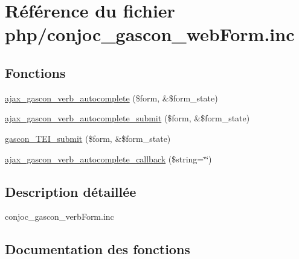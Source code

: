 \hypertarget{php_2conjoc__gascon__web_form_8inc}{}\section{Référence du fichier php/conjoc\+\_\+gascon\+\_\+web\+Form.inc}
\label{php_2conjoc__gascon__web_form_8inc}
\subsection*{Fonctions}
\begin{DoxyCompactItemize}
\item 
\hyperlink{php_2conjoc__gascon__web_form_8inc_a28516e435edf21d85ed77091d71f5d6b}{ajax\+\_\+gascon\+\_\+verb\+\_\+autocomplete} (\$form, \&\$form\+\_\+state)
\item 
\hyperlink{php_2conjoc__gascon__web_form_8inc_a332dbb7ab0a2190165164326af8cc7f1}{ajax\+\_\+gascon\+\_\+verb\+\_\+autocomplete\+\_\+submit} (\$form, \&\$form\+\_\+state)
\item 
\hyperlink{php_2conjoc__gascon__web_form_8inc_aeae9bd30b3fa7e4a9edf10587db73c23}{gascon\+\_\+\+T\+E\+I\+\_\+submit} (\$form, \&\$form\+\_\+state)
\item 
\hyperlink{php_2conjoc__gascon__web_form_8inc_a1be8e9edb4dcdb19c5b5bb88b48c5980}{ajax\+\_\+gascon\+\_\+verb\+\_\+autocomplete\+\_\+callback} (\$string=\char`\"{}\char`\"{})
\end{DoxyCompactItemize}


\subsection{Description détaillée}
conjoc\+\_\+gascon\+\_\+verb\+Form.\+inc 

\subsection{Documentation des fonctions}
\hypertarget{php_2conjoc__gascon__web_form_8inc_a28516e435edf21d85ed77091d71f5d6b}{}\label{php_2conjoc__gascon__web_form_8inc_a28516e435edf21d85ed77091d71f5d6b} 

